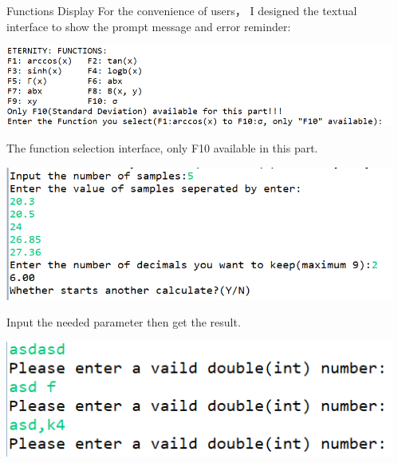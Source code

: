 \documentclass[final]{beamer}
\newlength{\onecolwid}
\newlength{\twocolwid}
\begin{document}
\begin{frame}[t]
\begin{columns}[t]
\begin{column}{\twocolwid}
\begin{columns}[t,totalwidth=\twocolwid]
\begin{column}{\onecolwid} %
\vspace{-2cm}
\begin{block}{Functions Display}
For the convenience of users， I designed the textual interface to show the prompt message and error reminder:
\begin{center}
    \includegraphics[width=1\linewidth]{interface1.png}
\end{center}
The function selection interface, only F10 available in this part.
\begin{center}
    \includegraphics[width=1\linewidth]{interface2.png}
\end{center}
\vspace{-0.7cm}
Input the needed parameter then get the result.
\vspace{-1cm}
\begin{center}
    \includegraphics[height=0.2\linewidth,width=1\linewidth]{error1.png}
\end{center}
\end{block}


\end{column} %

\begin{column}{\onecolwid} %


\end{column}
\end{columns}
\end{column}
\end{columns}
\end{frame}
\end{document}
